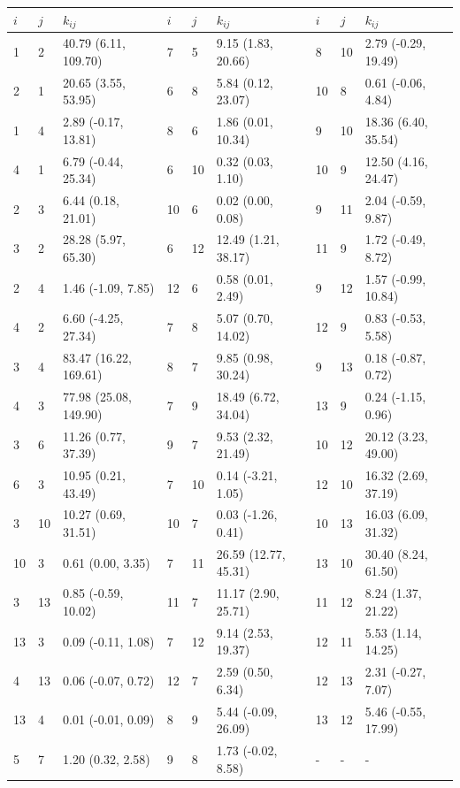 \begin{table}
 \centering
 \label{tab:sens_2_rate_matrix}
 \begin{tabular}{lllllllll}
 \toprule
 $i$ & $j$ &  $k_{ij}$ & $i$ & $j$ &  $k_{ij}$ & $i$ & $j$ &  $k_{ij}$ \\
 \midrule
 1 & 2 & 40.79 (6.11, 109.70) & 7 & 5 & 9.15 (1.83, 20.66) & 8 & 10 & 2.79 (-0.29, 19.49) \\
 2 & 1 & 20.65 (3.55, 53.95) & 6 & 8 & 5.84 (0.12, 23.07) & 10 & 8 & 0.61 (-0.06, 4.84) \\
 1 & 4 & 2.89 (-0.17, 13.81) & 8 & 6 & 1.86 (0.01, 10.34) & 9 & 10 & 18.36 (6.40, 35.54) \\
 4 & 1 & 6.79 (-0.44, 25.34) & 6 & 10 & 0.32 (0.03, 1.10) & 10 & 9 & 12.50 (4.16, 24.47) \\
 2 & 3 & 6.44 (0.18, 21.01) & 10 & 6 & 0.02 (0.00, 0.08) & 9 & 11 & 2.04 (-0.59, 9.87) \\
 3 & 2 & 28.28 (5.97, 65.30) & 6 & 12 & 12.49 (1.21, 38.17) & 11 & 9 & 1.72 (-0.49, 8.72) \\
 2 & 4 & 1.46 (-1.09, 7.85) & 12 & 6 & 0.58 (0.01, 2.49) & 9 & 12 & 1.57 (-0.99, 10.84) \\
 4 & 2 & 6.60 (-4.25, 27.34) & 7 & 8 & 5.07 (0.70, 14.02) & 12 & 9 & 0.83 (-0.53, 5.58) \\
 3 & 4 & 83.47 (16.22, 169.61) & 8 & 7 & 9.85 (0.98, 30.24) & 9 & 13 & 0.18 (-0.87, 0.72) \\
 4 & 3 & 77.98 (25.08, 149.90) & 7 & 9 & 18.49 (6.72, 34.04) & 13 & 9 & 0.24 (-1.15, 0.96) \\
 3 & 6 & 11.26 (0.77, 37.39) & 9 & 7 & 9.53 (2.32, 21.49) & 10 & 12 & 20.12 (3.23, 49.00) \\
 6 & 3 & 10.95 (0.21, 43.49) & 7 & 10 & 0.14 (-3.21, 1.05) & 12 & 10 & 16.32 (2.69, 37.19) \\
 3 & 10 & 10.27 (0.69, 31.51) & 10 & 7 & 0.03 (-1.26, 0.41) & 10 & 13 & 16.03 (6.09, 31.32) \\
 10 & 3 & 0.61 (0.00, 3.35) & 7 & 11 & 26.59 (12.77, 45.31) & 13 & 10 & 30.40 (8.24, 61.50) \\
 3 & 13 & 0.85 (-0.59, 10.02) & 11 & 7 & 11.17 (2.90, 25.71) & 11 & 12 & 8.24 (1.37, 21.22) \\
 13 & 3 & 0.09 (-0.11, 1.08) & 7 & 12 & 9.14 (2.53, 19.37) & 12 & 11 & 5.53 (1.14, 14.25) \\
 4 & 13 & 0.06 (-0.07, 0.72) & 12 & 7 & 2.59 (0.50, 6.34) & 12 & 13 & 2.31 (-0.27, 7.07) \\
 13 & 4 & 0.01 (-0.01, 0.09) & 8 & 9 & 5.44 (-0.09, 26.09) & 13 & 12 & 5.46 (-0.55, 17.99) \\
 5 & 7 & 1.20 (0.32, 2.58) & 9 & 8 & 1.73 (-0.02, 8.58) & - & - &   - \\
 \hline
 \end{tabular}
\end{table}

